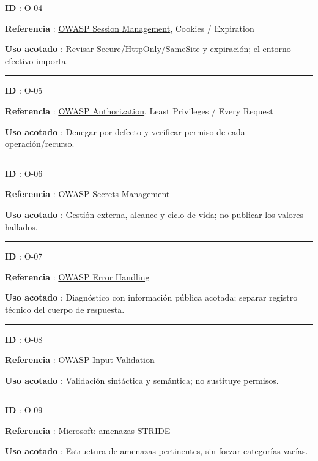 \documentclass[12pt,a4paper]{report}
\begin{document}
\textbf{ID }: O-04

\textbf{Referencia
}: \href{https://cheatsheetseries.owasp.org/cheatsheets/Session_Management_Cheat_Sheet.html}{OWASP
Session Management}, Cookies / Expiration

\textbf{Uso acotado }: Revisar Secure/HttpOnly/SameSite y expiración; el
entorno efectivo importa.

\medskip\hrule\medskip

\textbf{ID }: O-05

\textbf{Referencia
}: \href{https://cheatsheetseries.owasp.org/cheatsheets/Authorization_Cheat_Sheet.html}{OWASP
Authorization}, Least Privileges / Every Request

\textbf{Uso acotado }: Denegar por defecto y verificar permiso de cada
operación/recurso.

\medskip\hrule\medskip

\textbf{ID }: O-06

\textbf{Referencia
}: \href{https://cheatsheetseries.owasp.org/cheatsheets/Secrets_Management_Cheat_Sheet.html}{OWASP
Secrets Management}

\textbf{Uso acotado }: Gestión externa, alcance y ciclo de vida; no
publicar los valores hallados.

\medskip\hrule\medskip

\textbf{ID }: O-07

\textbf{Referencia
}: \href{https://cheatsheetseries.owasp.org/cheatsheets/Error_Handling_Cheat_Sheet.html}{OWASP
Error Handling}

\textbf{Uso acotado }: Diagnóstico con información pública acotada;
separar registro técnico del cuerpo de respuesta.

\medskip\hrule\medskip

\textbf{ID }: O-08

\textbf{Referencia
}: \href{https://cheatsheetseries.owasp.org/cheatsheets/Input_Validation_Cheat_Sheet.html}{OWASP
Input Validation}

\textbf{Uso acotado }: Validación sintáctica y semántica; no sustituye
permisos.

\medskip\hrule\medskip

\textbf{ID }: O-09

\textbf{Referencia
}: \href{https://learn.microsoft.com/en-us/azure/security/develop/threat-modeling-tool-threats}{Microsoft:
amenazas STRIDE}

\textbf{Uso acotado }: Estructura de amenazas pertinentes, sin forzar
categorías vacías.
\end{document}

